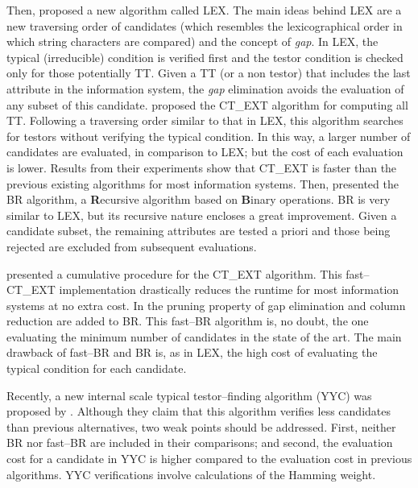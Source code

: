 \documentclass[authoryear,preprint,review,12pt]{elsarticle}
\begin{document}
  Then, \cite{Santiesteban03} proposed a new algorithm called LEX. The main ideas behind LEX are a new traversing
  order of candidates (which resembles the lexicographical order in which string characters are compared) and the
  concept of \emph{gap}. In LEX, the typical (irreducible) condition is verified first and the testor condition 
  is checked only for those potentially TT. Given a TT (or a non testor) that includes the last attribute in the
  information system, the \emph{gap} elimination avoids the evaluation of any subset of this candidate. \cite{Sanchez07}
  proposed the CT\_EXT algorithm for computing all TT. Following a traversing order similar to that in LEX, this
  algorithm searches for testors without verifying the typical condition. In this way, a larger number of 
  candidates are evaluated, in comparison to LEX; but the cost of each evaluation is lower. Results from their
  experiments show that CT\_EXT is faster than the previous existing algorithms for most information systems. Then,
  \cite{Lias09} presented the BR algorithm, a \textbf{R}ecursive algorithm based on \textbf{B}inary operations. 
  BR is very similar to LEX, but its recursive nature encloses a great improvement. Given a candidate subset, the 
  remaining attributes are tested a priori and those being rejected are excluded from subsequent evaluations. 
  
  \cite{Sanchez10} presented a cumulative procedure for the CT\_EXT algorithm. This fast--CT\_EXT implementation
  drastically reduces the runtime for most information systems at no extra cost. In \citep{Lias13} the pruning property of
  gap elimination and column reduction are added to BR. This fast--BR algorithm is, no doubt, the one 
  evaluating the minimum number of candidates in the state of the art. The main drawback of fast--BR and 
  BR is, as in LEX, the high cost of evaluating the typical condition for each candidate.
  
  Recently, a new internal scale typical testor--finding algorithm (YYC) was proposed by \cite{Alba14}. 
  Although they claim that this algorithm verifies less candidates than previous alternatives, two weak points
  should be addressed. First, neither BR nor fast--BR are included in their comparisons; and second, the evaluation cost for a candidate in YYC is higher compared to the evaluation cost in previous algorithms. YYC verifications involve calculations of the Hamming weight.
  
\end{document}
